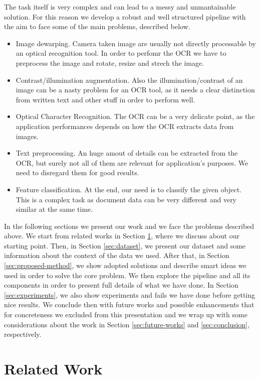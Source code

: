 \documentclass[10pt,twocolumn,letterpaper]{article}
\begin{document}
The task itself is very complex and can lead to a messy and
unmantainable solution. For this reason we develop a robust and well
structured pipeline with the aim to face some of the main problems,
described below.
\begin{itemize}
  \item Image dewarping. Camera taken image are usually not directly
    processable by an optical recognition tool. In order to perfomr
    the OCR we have to preprocess the image and rotate, resize and
    strech the image.
  \item Contrast/illumination augmentation. Also the
    illumination/contrast of an image can be a nasty problem for an
    OCR tool, as it needs a clear distinction from written text and
    other stuff in order to perform well.
  \item Optical Character Recognition. The OCR can be a very delicate
    point, as the application performances depends on how the OCR
    extracts data from images.
  \item Text preprocessing. An huge amout of details can be extracted
    from the OCR, but surely not all of them are relevant for
    application's purposes. We need to disregard them for good
    results.
  \item Feature classification. At the end, our need is to classify
    the given object. This is a complex task as document data can be
    very different and very similar at the same time.
\end{itemize}

In the following sections we present our work and we face the problems
described above. We start from related works in Section
\ref{sec:related-work}, where we discuss about our starting
point. Then, in Section \ref{sec:dataset}, we present our dataset and
some information about the context of the data we used. After that, in
Section \ref{sec:proposed-method}, we show adopted solutions and
describe smart ideas we used in order to solve the core problem. We
then explore the pipeline and all its components in order to present
full details of what we have done. In Section \ref{sec:experiments},
we also show experiments and fails we have done before getting nice
results. We conclude then with future works and possible enhancements
that for concreteness we excluded from this presentation and we wrap
up with some considerations about the work in Section
\ref{sec:future-works} and \ref{sec:conclusion}, respectively.

\section{Related Work}
\label{sec:related-work}
\end{document}

